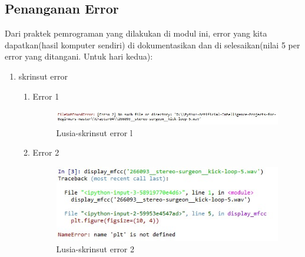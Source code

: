 \subsection{Penanganan Error}
Dari praktek pemrograman yang dilakukan di modul ini, error yang kita dapatkan(hasil komputer sendiri) di dokumentasikan dan di selesaikan(nilai 5 per error yang ditangani. Untuk hari kedua):

\begin{enumerate}
	\item skrinsut error
		\begin{enumerate}
		\item Error 1
			\begin{figure}[!hbtp]
			\centering
			\includegraphics[scale=0.5]{figures/u1.jpg}
			\caption{Lusia-skrinsut error l}
			\label{6C1}
			\end{figure}
		\item Error 2
			\begin{figure}[!hbtp]
			\centering
			\includegraphics[scale=0.5]{figures/u2.jpg}
			\caption{Lusia-skrinsut error 2}
			\label{6C2}
			\end{figure}
		\end{enumerate}
		

\end{enumerate}
